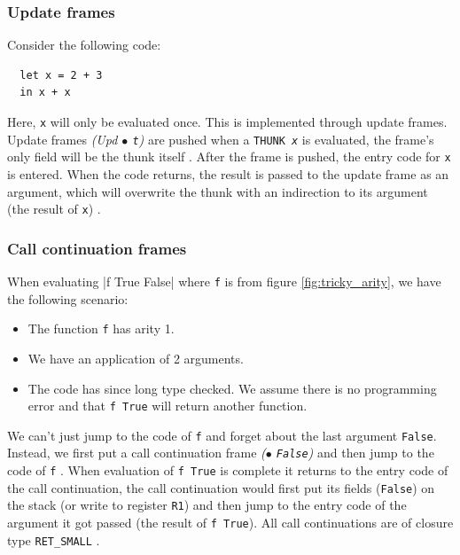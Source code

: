 \subsubsection{Update frames}

Consider the following code:

\begin{verbatim}
  let x = 2 + 3
  in x + x
\end{verbatim}

Here, \texttt{x} will only be evaluated once. This is implemented
through update frames. Update frames \emph{(Upd $\bullet$ \texttt{t})}
are pushed when a \texttt{THUNK \emph{x}} is evaluated, the frame's only
field will be the thunk itself \cite{github_thunk_code}. After the frame is
pushed, the entry code for \texttt{x} is entered. When the code returns,
the result is passed to the update frame as an argument, which will
overwrite the thunk with an indirection to its argument (the result of
\texttt{x}) \cite{github_updates_indirection}.


\subsubsection{Call continuation frames}

When evaluating |f True False|
where \texttt{f} is from figure \ref{fig:tricky_arity}, we have the
following scenario:

\begin{itemize}
  \item
    The function \texttt{f} has arity 1.
  \item
    We have an application of 2 arguments.
  \item
    The code has since long type checked. We assume there is no
programming error and that \texttt{f True} will return another function.
\end{itemize}

We can't just jump to the code of \texttt{f} and forget about the last
argument \texttt{False}. Instead, we first put a call continuation
frame \emph{($\bullet$ \texttt{False})} and then jump to the code of \texttt{f}
\cite{evalapplyjfp06}.
When evaluation of \texttt{f True} is complete it returns to
the entry code of the call continuation, the call continuation would
first put its fields (\texttt{False}) on the stack (or write to
register \texttt{R1}) and then jump to the entry code of the argument it
got passed (the result of \texttt{f True}).
All call continuations are of closure type \texttt{RET\_SMALL}
\cite{github_genapply_RET_SMALL}.

